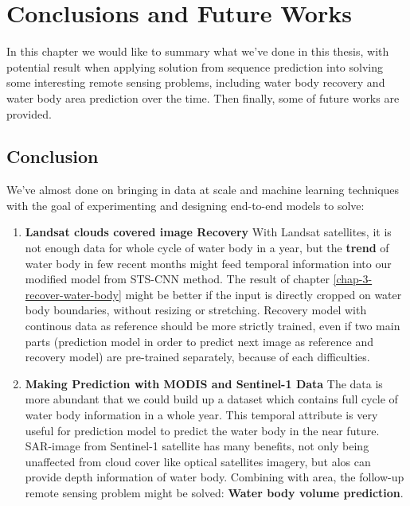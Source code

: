 \chapter{Conclusions and Future Works}
\label{chap-6-conclusions}
\begin{ChapAbstract}
In this chapter we would like to summary what we've done in this thesis, with potential result when applying solution from sequence prediction into solving some interesting remote sensing problems, including water body recovery and water body area prediction over the time. Then finally, some of future works are provided.
\end{ChapAbstract}

\section{Conclusion}

We've almost done on bringing in data at scale and machine learning techniques with the goal of experimenting and designing end-to-end models to solve:

\begin{enumerate}
	\item \textbf{Landsat clouds covered image Recovery} With Landsat satellites, it is not enough data for whole cycle of water body in a year, but the \textbf{trend} of water body in few recent months might feed temporal information into our modified model from STS-CNN method. The result of chapter \ref{chap-3-recover-water-body} might be better if the input is directly cropped on water body boundaries, without resizing or stretching. Recovery model with continous data as reference should be more strictly trained, even if two main parts (prediction model in order to predict next image as reference and recovery model) are pre-trained separately, because of each difficulties.
	
	\item \textbf{Making Prediction with MODIS and Sentinel-1 Data} The data is more abundant that we could build up a dataset which contains full cycle of water body information in a whole year. This temporal attribute is very useful for prediction model to predict the water body in the near future. SAR-image from Sentinel-1 satellite has many benefits, not only being unaffected from cloud cover like optical satellites imagery, but alos can provide depth information of water body. Combining with area, the follow-up remote sensing problem might be solved: \textbf{Water body volume prediction}.
\end{enumerate}

